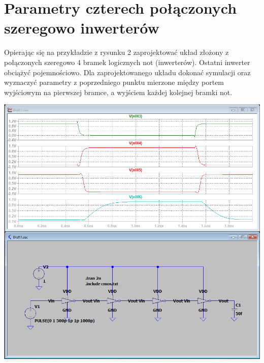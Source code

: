 \documentclass[a4paper, 11pt]{article}
\begin{document}

\section{Parametry czterech połączonych szeregowo inwerterów}\label{sec: parametry_szeregowo} %

Opierając się na przykładzie z rysunku 2 zaprojektować układ złożony z połączonych szeregowo 4 bramek
logicznych not (inwerterów). Ostatni inwerter obciążyć pojemnościowo. Dla zaprojektowanego układu dokonać symulacji
oraz wyznaczyć parametry z poprzedniego punktu mierzone między portem wyjściowym na pierwszej bramce, a wyjściem
każdej kolejnej bramki not.

\begin{center}
	\includegraphics[scale=0.35]{mikro_lab3/symulacja4.PNG}
\end{center}
\end{document}

